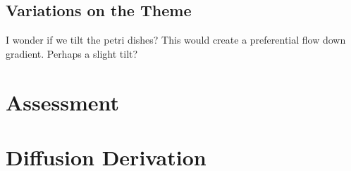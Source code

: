 \documentclass{article}
\begin{document}
\subsection{Variations on the Theme}

I wonder if we tilt the petri dishes?  This would create a preferential flow down gradient. Perhaps a slight tilt?





\section{Assessment}


\section{Diffusion Derivation}
\end{document}
